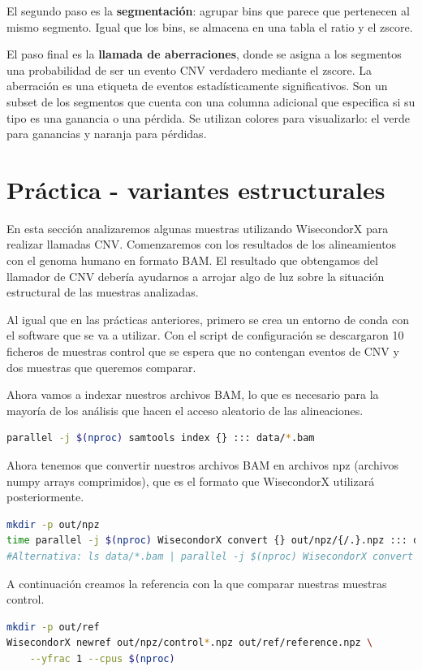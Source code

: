 \begin{itemize}
El segundo paso es la \textbf{segmentación}: agrupar bins que parece que pertenecen al mismo segmento. Igual que los bins, se almacena en una tabla el ratio y el zscore. 

El paso final es la \textbf{llamada de aberraciones}, donde se asigna a los segmentos una probabilidad de ser un evento CNV verdadero mediante el zscore. La aberración es una etiqueta de eventos estadísticamente significativos. Son un subset de los segmentos que cuenta con una columna adicional que especifica si su tipo es una ganancia o una pérdida. Se utilizan colores para visualizarlo: el verde para ganancias y naranja para pérdidas. 

\section{Práctica - variantes estructurales}
En esta sección analizaremos algunas muestras utilizando WisecondorX para realizar llamadas CNV.
Comenzaremos con los resultados de los alineamientos con el genoma humano en formato BAM.
El resultado que obtengamos del llamador de CNV debería ayudarnos a arrojar algo de luz sobre la situación estructural de las muestras analizadas.

Al igual  que en las prácticas anteriores, primero se crea un entorno de conda con el software que se va a utilizar. Con el script de configuración se descargaron 10 ficheros de muestras control que se espera que no contengan eventos de CNV y dos muestras que queremos comparar. 

Ahora vamos a indexar nuestros archivos BAM, lo que es necesario para la mayoría de los análisis que hacen el acceso aleatorio de las alineaciones.
\begin{lstlisting}[language=bash]
parallel -j $(nproc) samtools index {} ::: data/*.bam
\end{lstlisting}

Ahora tenemos que convertir nuestros archivos BAM en archivos npz (archivos numpy arrays comprimidos), que es el formato que WisecondorX utilizará posteriormente.
\begin{lstlisting}[language=bash]
mkdir -p out/npz
time parallel -j $(nproc) WisecondorX convert {} out/npz/{/.}.npz ::: data/*.bam
#Alternativa: ls data/*.bam | parallel -j $(nproc) WisecondorX convert {} out/npz/{/.}.npz
\end{lstlisting}

A continuación creamos la referencia con la que comparar nuestras muestras control.
\begin{lstlisting}[language=bash]
mkdir -p out/ref
WisecondorX newref out/npz/control*.npz out/ref/reference.npz \
    --yfrac 1 --cpus $(nproc)
\end{lstlisting}


\end{itemize}
